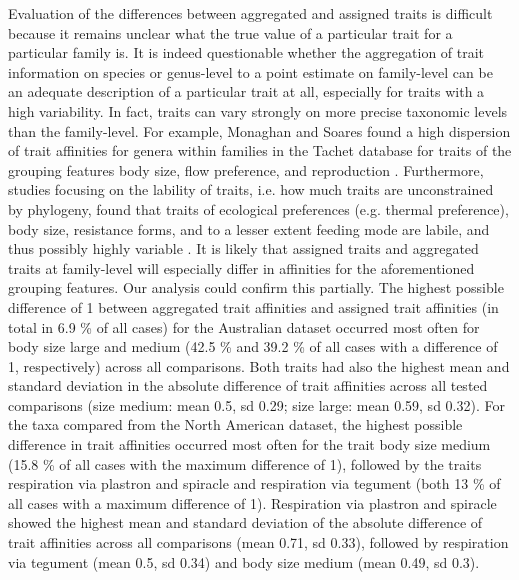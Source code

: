 \documentclass{article}
\begin{document}
Evaluation of the differences between aggregated and assigned traits is difficult because it remains unclear what the true value of a particular trait for a particular family is. It is indeed questionable whether the aggregation of trait information on species or genus-level to a point estimate on family-level can be an adequate description of a particular trait at all, especially for traits with a high variability. In fact, traits can vary strongly on more precise taxonomic levels than the family-level. For example, Monaghan and Soares found a high dispersion of trait affinities for genera within families in the Tachet database for traits of the grouping features body size, flow preference, and reproduction \cite{monaghan_improving_2013}. Furthermore, studies focusing on the lability of traits, i.e. how much traits are unconstrained by phylogeny, found that traits of ecological preferences (e.g. thermal preference), body size, resistance forms, and to a lesser extent feeding mode are labile, and thus possibly highly variable \cite{poff_functional_2006,wilkes_traitbased_2020}. It is likely that assigned traits and aggregated traits at family-level will especially differ in affinities for the aforementioned grouping features. Our analysis could confirm this partially. The highest possible difference of 1 between aggregated trait affinities and assigned trait affinities (in total in 6.9 \% of all cases) for the Australian dataset occurred most often for body size large and medium (42.5 \% and 39.2 \% of all cases with a difference of 1, respectively) across all comparisons. Both traits had also the highest mean and standard deviation in the absolute difference of trait affinities across all tested comparisons (size medium: mean 0.5, sd 0.29; size large: mean 0.59, sd 0.32). For the taxa compared from the North American dataset, the highest possible difference in trait affinities occurred most often for the trait body size medium (15.8 \% of all cases with the maximum difference of 1), followed by the traits respiration via plastron and spiracle and respiration via tegument (both 13 \% of all cases with a maximum difference of 1). Respiration via plastron and spiracle showed the highest mean and standard deviation of the absolute difference of trait affinities across all comparisons (mean 0.71, sd 0.33), followed by respiration via tegument (mean 0.5, sd 0.34) and body size medium (mean 0.49, sd 0.3). 
\end{document}
